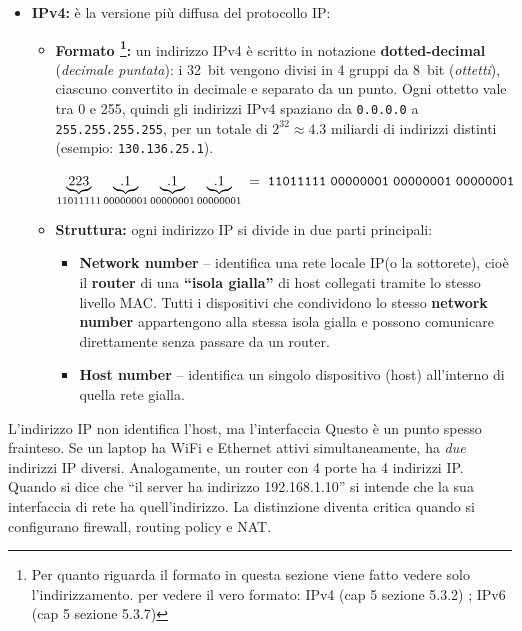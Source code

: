 \documentclass[a4paper,12pt]{report}
\begin{document}
\begin{itemize}
    \item \textbf{IPv4:} è la versione più diffusa del protocollo IP:
    \begin{itemize}
        \item \textbf{Formato \footnote{Per quanto riguarda il formato in questa sezione viene fatto vedere solo l'indirizzamento. per vedere il vero formato: IPv4 (cap 5 sezione 5.3.2) ; IPv6 (cap 5 sezione 5.3.7)}:} un indirizzo IPv4 è scritto in notazione \textbf{dotted-decimal} (\textit{decimale puntata}): i 32~bit vengono divisi in 4 gruppi da 8~bit (\textit{ottetti}), ciascuno convertito in decimale e separato da un punto. Ogni ottetto vale tra 0 e 255, quindi gli indirizzi IPv4 spaziano da \texttt{0.0.0.0} a \texttt{255.255.255.255}, per un totale di $2^{32} \approx 4.3$ miliardi di indirizzi distinti (esempio: \texttt{\textcolor{orange!85!black}{130.136}\textcolor{yellow!80!black}{.25.1}}).
        
        \[
        \underbrace{223}_{11011111}%
        \underbrace{.1}_{00000001}%
        \underbrace{.1}_{00000001}%
        \underbrace{.1}_{00000001}
        \;=\;
        \texttt{11011111\;00000001\;00000001\;00000001}
        \]

        \item \textbf{Struttura:} ogni indirizzo IP  si divide in due parti principali:
        \begin{itemize}
            \item \textbf{\textcolor{orange!85!black}{Network number}} – identifica una \textcolor{orange!85!black}{rete locale IP}(o la sottorete), cioè il \textbf{router} di una \textbf{“isola gialla”} di host collegati tramite lo stesso livello MAC.  
            Tutti i dispositivi che condividono lo stesso \textbf{network number} appartengono alla stessa isola gialla e possono comunicare direttamente senza passare da un router.
            
            \item \textbf{\textcolor{yellow!80!black}{Host number}} – identifica un singolo dispositivo (host) all’interno di quella rete gialla.  
        \end{itemize}
    \end{itemize}
\end{itemize}

\vspace{0.5cm} %

\begin{notebox}{L'indirizzo IP non identifica l'host, ma l'interfaccia}
Questo è un punto spesso frainteso. Se un laptop ha WiFi e Ethernet
attivi simultaneamente, ha \emph{due} indirizzi IP diversi. Analogamente,
un router con 4 porte ha 4 indirizzi IP. Quando si dice che
``il server ha indirizzo 192.168.1.10'' si intende che la sua interfaccia
di rete ha quell'indirizzo. La distinzione diventa critica quando si
configurano firewall, routing policy e NAT.
\end{notebox}
\end{document}
